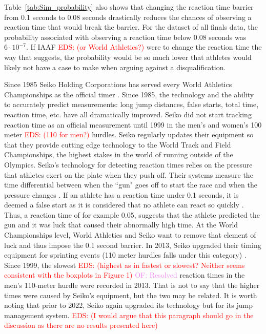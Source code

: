 \documentclass[12pt, letterpaper, titlepage]{article}
\newcommand{\eds}[1]{\textcolor{red}{EDS: (#1)}}
\newcommand{\of}[1]{\textcolor{violet}{OF: #1}}
\begin{document}
Table~\ref{tab:Sim_probability} also shows that changing the reaction time 
barrier from 0.1 seconds to 0.08 seconds drastically reduces the chances of 
observing a reaction time that would break the barrier.  For the dataset of all 
finals data, the probability
associated with observing a reaction time below 0.08 seconds was $6\cdot10^{-7}$.
If IAAF \eds{or World Athletics?} were to change the reaction time the way that 
\citet{komi2009iaaf}
suggests, the probability would be so much lower that athletes would likely not
have a case to make when arguing against a disqualification.


Since 1985 Seiko Holding Corporations has served every World Athletics 
Championships as the official timer \citep{wa2022seiko}.  Since 1985, the 
technology and the ability
to accurately predict measurements: long jump distances, false starts, total 
time, reaction time, etc. have all dramatically improved.  Seiko did not start 
tracking reaction time as an official measurement until 1999 in the men's and 
women's 100 meter \eds{110 for men?} hurdles. 
Seiko regularly updates their equipment so that they provide cutting edge
technology to the World Track and Field Championships, the highest stakes in the 
world of running outside of the Olympics. Seiko's technology for detecting 
reaction times relies on the pressure that athletes exert on the plate when they 
push off.  Their systems measure the time differential
between when the ``gun" goes off to start the race and when the pressure changes 
\citep{wa2022seiko}.  If an athlete has a reaction time under 0.1 seconds, it 
is deemed a 
false start as it is considered that no athlete can react so quickly 
\citep{Seiko-Timing}.  Thus, a reaction time of for example 0.05, suggests that 
the athlete predicted the gun and it was luck that caused their abnormally high 
time.  At the World Championships level, World Athletics and Seiko want to remove 
that element of luck and thus impose the 0.1 second barrier. In 2013, Seiko 
upgraded their timing equipment for sprinting events (110 meter hurdles falls 
under this category) \citep{wa2013backtage}. Since 1999, the
slowest \eds{highest as in fastest or slowest? Neither seems consistent with 
the boxplots in Figure 1} \of{Resolved} reaction 
times in the men's 110-meter hurdle were recorded in 2013.  That is not to say
 that the higher 
times were caused by Seiko's equipment, but the two may be related.  It is worth 
noting that prior
to 2022, Seiko again upgraded its technology but for its jump management system.
\eds{I would argue that this paragraph should go in the discussion as there are 
no results presented here}
\end{document}
